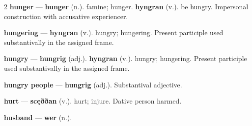 \begin{multicols}{2}
\textbf{hunger} — \textbf{hunger} (n.). famine; hunger. \textbf{hyngran} (v.). be hungry. Impersonal construction with accusative experiencer.\par
\textbf{hungering} — \textbf{hyngran} (v.). hungry; hungering. Present participle used substantivally in the assigned frame.\par
\textbf{hungry} — \textbf{hungrig} (adj.).  \textbf{hyngran} (v.). hungry; hungering. Present participle used substantivally in the assigned frame.\par
\textbf{hungry people} — \textbf{hungrig} (adj.). Substantival adjective.\par
\textbf{hurt} — \textbf{scęððan} (v.). hurt; injure. Dative person harmed.\par
\textbf{husband} — \textbf{wer} (n.).\par

\end{multicols}
